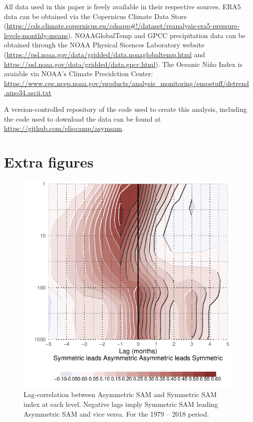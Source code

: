 \documentclass[smallextended]{svjour3}       %
\begin{document}
All data used in this paper is freely available in their respective sources. ERA5 data can be obtained via the Copernicus Climate Data Store (\url{https://cds.climate.copernicus.eu/cdsapp\#!/dataset/reanalysis-era5-pressure-levels-monthly-means}). NOAAGlobalTemp and GPCC precipitation data can be obtained through the NOAA Physical Sicences Laboratory website (\url{https://psl.noaa.gov/data/gridded/data.noaaglobaltemp.html} and \url{https://psl.noaa.gov/data/gridded/data.gpcc.html}). The Oceanic Niño Index is avaiable via NOAA's Climate Precidction Center: \url{https://www.cpc.ncep.noaa.gov/products/analysis_monitoring/ensostuff/detrend.nino34.ascii.txt}

A version-controlled repository of the code used to create this analysis, including the code used to download the data can be found at \url{https://github.com/eliocamp/asymsam}.

\newpage

\appendix


\hypertarget{extra-figures}{%
\section{Extra figures}\label{extra-figures}}

\newpage

\begin{figure}[ht]
\includegraphics{A1-1} \caption{Lag-correlation between Asymmetric SAM and Symmetric SAM index at each level. Negative lags imply Symmetric SAM leading Asymmetric SAM and vice versa. For the 1979 -- 2018 period.}\label{fig:A1}
\end{figure}
\end{document}
